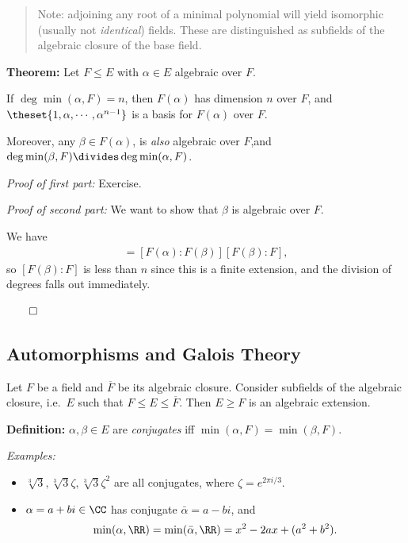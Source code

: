 \begin{quote}
Note: adjoining any root of a minimal polynomial will yield isomorphic
(usually not \emph{identical}) fields. These are distinguished as
subfields of the algebraic closure of the base field.
\end{quote}

\textbf{Theorem:} Let \(F \leq E\) with \(\alpha \in E\) algebraic over
\(F\).

If \(\deg\min(\alpha, F) = n\), then \(F(\alpha)\) has dimension \(n\)
over \(F\), and \(\theset{1, \alpha, \cdots, \alpha^{n-1}}\) is a basis
for \(F(\alpha)\) over \(F\).

Moreover, any \(\beta \in F(\alpha)\), is \emph{also} algebraic over
\(F\),and \(\deg\min(\beta, F) \divides \deg \min(\alpha, F)\).

\emph{Proof of first part:} Exercise.

\emph{Proof of second part:} We want to show that \(\beta\) is algebraic
over \(F\).

We have
\begin{align*}
[F(\alpha):F] = [F(\alpha): F(\beta)][F(\beta): F]
,\end{align*} so \([F(\beta) : F]\) is less than \(n\) since this is a
finite extension, and the division of degrees falls out immediately.

\(\qed\)

\hypertarget{automorphisms-and-galois-theory}{%
\subsection{Automorphisms and Galois
Theory}\label{automorphisms-and-galois-theory}}

Let \(F\) be a field and \(\overline F\) be its algebraic closure.
Consider subfields of the algebraic closure, i.e.~\(E\) such that
\(F \leq E \leq \overline F\). Then \(E \geq F\) is an algebraic
extension.

\textbf{Definition:} \(\alpha, \beta \in E\) are \emph{conjugates} iff
\(\min(\alpha, F) = \min(\beta, F)\).

\emph{Examples:}

\begin{itemize}
\item
  \(\sqrt[3]{3}, \sqrt[3]{3}\zeta, \sqrt[3]{3}\zeta^2\) are all
  conjugates, where \(\zeta = e^{2\pi i/3}\).
\item
  \(\alpha = a+bi \in \CC\) has conjugate \(\bar \alpha = a-bi\), and
  \begin{align*}
  \min(\alpha, \RR) = \min(\bar \alpha, \RR) = x^2 - 2ax + (a^2 + b^2)
  .\end{align*}
\end{itemize}

